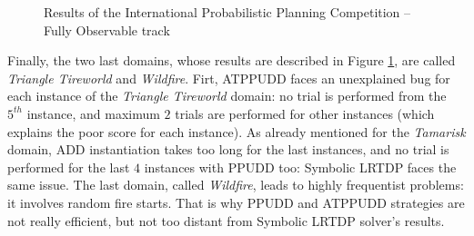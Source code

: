 \begin{figure}
\caption[Results of IPPC 2014: \textit{Triangle tireworld} and \textit{Wildfire} problems]{
Results of the International Probabilistic Planning Competition -- Fully Observable track}
\label{figure_IPPC_TRI_WIL}
\end{figure}

Finally, the two last domains, whose results are described in Figure \ref{figure_IPPC_TRI_WIL},
are called \textit{Triangle Tireworld} and \textit{Wildfire}.
Firt, ATPPUDD faces an unexplained bug for each instance of the \textit{Triangle Tireworld} domain:
no trial is performed from the $5^{th}$ instance, and maximum $2$ trials are performed for other instances
(which explains the poor score for each instance).
As already mentioned for the \textit{Tamarisk} domain, 
ADD instantiation takes too long for the last instances,
and no trial is performed for the last $4$ instances 
with PPUDD too: Symbolic LRTDP faces the same issue. 
The last domain, called \textit{Wildfire}, leads to highly frequentist problems:
it involves random fire starts. 
That is why PPUDD and ATPPUDD strategies are not really efficient, 
but not too distant from Symbolic LRTDP solver's results.



